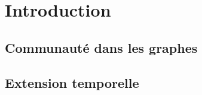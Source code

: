 \chapter{Introduction}
\section{Communauté dans les graphes}
\cite{Fortunato2010}
\section{Extension temporelle}